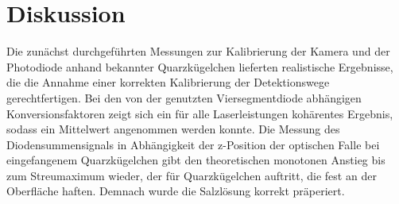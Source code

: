 \newpage
\section{Diskussion}
    Die zunächst durchgeführten Messungen zur Kalibrierung der Kamera und der Photodiode anhand bekannter Quarzkügelchen lieferten realistische Ergebnisse, die die Annahme einer korrekten Kalibrierung der 
    Detektionswege gerechtfertigen. Bei den von der genutzten Viersegmentdiode abhängigen Konversionsfaktoren zeigt sich ein für alle Laserleistungen kohärentes Ergebnis, sodass ein Mittelwert angenommen
    werden konnte. Die Messung des Diodensummensignals in Abhängigkeit der z-Position der optischen Falle bei eingefangenem Quarzkügelchen gibt den theoretischen monotonen Anstieg bis zum Streumaximum wieder, 
    der für Quarzkügelchen auftritt, die fest an der Oberfläche haften. Demnach wurde die Salzlösung korrekt präperiert.

